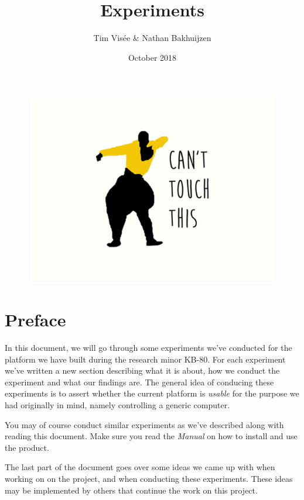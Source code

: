 \documentclass[a4paper]{article}
\title{Experiments}
\author{Tim Visée \& Nathan Bakhuijzen}
\date{October 2018}
\begin{document}
  \maketitle
  \begin{figure}[h]
    \centering
    \includegraphics[width=\linewidth]{cant-touch-this}
  \end{figure}
  \clearpage

  \section*{Preface}
  In this document, we will go through some experiments we've conducted for the
  platform we have built during the research minor KB-80. For each experiment
  we've written a new section describing what it is about, how we conduct the
  experiment and what our findings are. The general idea of conducing these
  experiments is to assert whether the current platform is \emph{usable} for
  the purpose we had originally in mind, namely controlling a generic computer.

  You may of course conduct similar experiments as we've described along with
  reading this document. Make sure you read the \emph{Manual} on how to install
  and use the product.

  The last part of the document goes over some ideas we came up with when
  working on on the project, and when conducting these experiments. These
  ideas may be implemented by others that continue the work on this project.

  \clearpage
\end{document}
